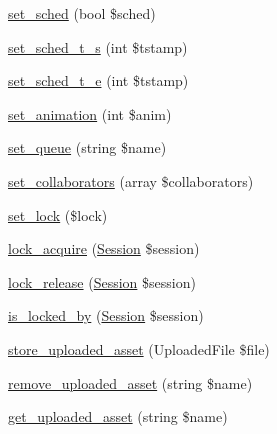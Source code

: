 \begin{DoxyCompactItemize}
\hyperlink{classlibresignage_1_1common_1_1php_1_1slide_1_1Slide_ad97c51e4324ffbddb791d1a906a2c3fd}{set\+\_\+sched} (bool \$sched)
\item 
\hyperlink{classlibresignage_1_1common_1_1php_1_1slide_1_1Slide_acedb1a9ed68015ee252811cc48fbc45b}{set\+\_\+sched\+\_\+t\+\_\+s} (int \$tstamp)
\item 
\hyperlink{classlibresignage_1_1common_1_1php_1_1slide_1_1Slide_a8437d82f436d281dea67da2ba5862623}{set\+\_\+sched\+\_\+t\+\_\+e} (int \$tstamp)
\item 
\hyperlink{classlibresignage_1_1common_1_1php_1_1slide_1_1Slide_a516b1bc8fe4f5b52b91d3c628d1a49c6}{set\+\_\+animation} (int \$anim)
\item 
\hyperlink{classlibresignage_1_1common_1_1php_1_1slide_1_1Slide_a1868fb299bad4a5e0f7202083d0b8b05}{set\+\_\+queue} (string \$name)
\item 
\hyperlink{classlibresignage_1_1common_1_1php_1_1slide_1_1Slide_a183057a153ef40efb966511410403812}{set\+\_\+collaborators} (array \$collaborators)
\item 
\hyperlink{classlibresignage_1_1common_1_1php_1_1slide_1_1Slide_a829b130a5fd9824d2599f036cc3d7fc0}{set\+\_\+lock} (\$lock)
\item 
\hyperlink{classlibresignage_1_1common_1_1php_1_1slide_1_1Slide_ae63f0ae212c667424e2559153715ce57}{lock\+\_\+acquire} (\hyperlink{classlibresignage_1_1common_1_1php_1_1auth_1_1Session}{Session} \$session)
\item 
\hyperlink{classlibresignage_1_1common_1_1php_1_1slide_1_1Slide_a1f353f30f6318dbd71ec62716121075b}{lock\+\_\+release} (\hyperlink{classlibresignage_1_1common_1_1php_1_1auth_1_1Session}{Session} \$session)
\item 
\hyperlink{classlibresignage_1_1common_1_1php_1_1slide_1_1Slide_a11ae713abb81d2e02757dc6d1cdd9a2c}{is\+\_\+locked\+\_\+by} (\hyperlink{classlibresignage_1_1common_1_1php_1_1auth_1_1Session}{Session} \$session)
\item 
\hyperlink{classlibresignage_1_1common_1_1php_1_1slide_1_1Slide_aa8eba48377d0306ce4dda607f4e38d49}{store\+\_\+uploaded\+\_\+asset} (Uploaded\+File \$file)
\item 
\hyperlink{classlibresignage_1_1common_1_1php_1_1slide_1_1Slide_a571c25b85b2e7aeae3fecc99ec3f3ede}{remove\+\_\+uploaded\+\_\+asset} (string \$name)
\item 
\hyperlink{classlibresignage_1_1common_1_1php_1_1slide_1_1Slide_a2e1a7edc723974a4ba294c10a9ba7365}{get\+\_\+uploaded\+\_\+asset} (string \$name)
\item 

\end{DoxyCompactItemize}
